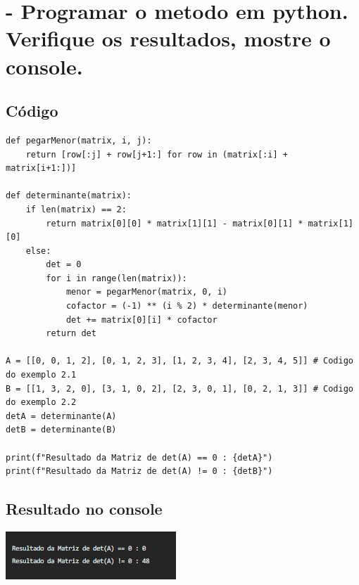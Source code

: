 \documentclass[a4paper, 12pt]{article}
\begin{document}
\section{- Programar o metodo em python. Verifique os resultados, mostre o console.}

\begin{scriptsize}
\subsection{Código}
\begin{lstlisting}
def pegarMenor(matrix, i, j):
    return [row[:j] + row[j+1:] for row in (matrix[:i] + matrix[i+1:])]

def determinante(matrix):
    if len(matrix) == 2:
        return matrix[0][0] * matrix[1][1] - matrix[0][1] * matrix[1][0]
    else:
        det = 0
        for i in range(len(matrix)): 
            menor = pegarMenor(matrix, 0, i)
            cofactor = (-1) ** (i % 2) * determinante(menor)
            det += matrix[0][i] * cofactor
        return det

A = [[0, 0, 1, 2], [0, 1, 2, 3], [1, 2, 3, 4], [2, 3, 4, 5]] # Codigo do exemplo 2.1
B = [[1, 3, 2, 0], [3, 1, 0, 2], [2, 3, 0, 1], [0, 2, 1, 3]] # Codigo do exemplo 2.2
detA = determinante(A)
detB = determinante(B)

print(f"Resultado da Matriz de det(A) == 0 : {detA}")
print(f"Resultado da Matriz de det(A) != 0 : {detB}")
\end{lstlisting}
\end{scriptsize}

\subsection{Resultado no console}
\center\includegraphics{Console.jpg}
\end{document}
